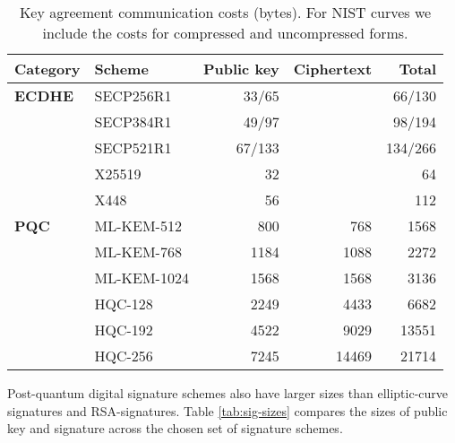 \documentclass[letterpaper,12pt,titlepage,oneside,final]{book}
\begin{document}
\begin{table}[h]
\centering
\caption{Key agreement communication costs (bytes). 
For NIST curves we include the costs for compressed and uncompressed forms.
}
\vspace{1em}
\label{tab:kex-traffic-sizes}
\footnotesize\begin{tabular}{llrrr}
\toprule
    \textbf{Category} 
    & \textbf{Scheme} 
    & \textbf{Public key} 
    & \textbf{Ciphertext}
    & \textbf{Total} \\
\midrule
\textbf{ECDHE}
& SECP256R1                 & 33/65    &        & 66/130  \\
& SECP384R1                 & 49/97    &        & 98/194  \\
& SECP521R1                 & 67/133   &        & 134/266 \\
& X25519                    & 32    &        & 64  \\
& X448                      & 56    &        & 112 \\
\midrule
\textbf{PQC}
& ML-KEM-512                & 800   & 768    & 1568 \\
& ML-KEM-768                & 1184  & 1088   & 2272 \\
& ML-KEM-1024               & 1568  & 1568   & 3136 \\
& HQC-128                   & 2249  & 4433   & 6682 \\
& HQC-192                   & 4522  & 9029   & 13551 \\
& HQC-256                   & 7245  & 14469  & 21714 \\
\bottomrule
\end{tabular}
\end{table}

Post-quantum digital signature schemes also have larger sizes than elliptic-curve signatures and RSA-signatures. 
Table \ref{tab:sig-sizes} compares the sizes of public key and signature across the chosen set of signature schemes.
\end{document}
